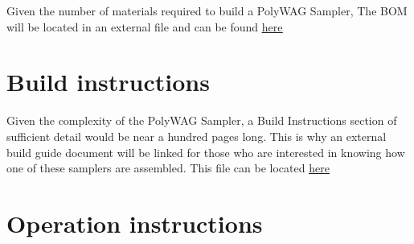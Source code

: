 \documentclass[11pt, letterpaper]{article}
\begin{document}


Given the number of materials required to build a PolyWAG Sampler, The BOM will be located in an external file and can be found \href{https://docs.google.com/spreadsheets/d/1WZbGYL1k3ne1a8Z1YOA0necr3MgxMj_BiEK7JuaGnzE/edit#gid=1118434588}{\underline{here}}


\section{Build instructions}

Given the complexity of the PolyWAG Sampler, a Build Instructions section of sufficient detail would be near a hundred pages long. This is why an external build guide document will be linked for those who are interested in knowing how one of these samplers are assembled. This file can be located \href{https://drive.google.com/file/d/1QSpYj-N6-jE-VbXLVelzRzzdIF1lMkuC/view?usp=sharing}{\underline{here}}

\section{Operation instructions}
\end{document}
